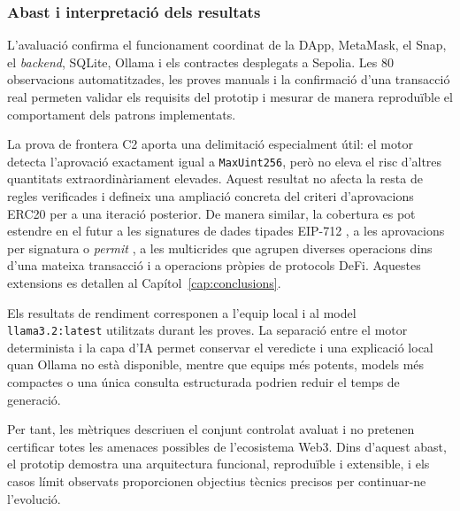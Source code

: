 \subsubsection{Abast i interpretació dels resultats}
\label{sec:limitacions_avaluacio}

L'avaluació confirma el funcionament coordinat de la DApp, MetaMask, el Snap, el \textit{backend}, SQLite, Ollama i els contractes desplegats a Sepolia. Les 80 observacions automatitzades, les proves manuals i la confirmació d'una transacció real permeten validar els requisits del prototip i mesurar de manera reproduïble el comportament dels patrons implementats.

La prova de frontera C2 aporta una delimitació especialment útil: el motor detecta l'aprovació exactament igual a \texttt{MaxUint256}, però no eleva el risc d'altres quantitats extraordinàriament elevades. Aquest resultat no afecta la resta de regles verificades i defineix una ampliació concreta del criteri d'aprovacions ERC20 per a una iteració posterior. De manera similar, la cobertura es pot estendre en el futur a les signatures de dades tipades EIP-712 \cite{eip712}, a les aprovacions per signatura o \textit{permit} \cite{eip2612}, a les multicrides que agrupen diverses operacions dins d'una mateixa transacció \cite{openzeppelin_contracts} i a operacions pròpies de protocols DeFi. Aquestes extensions es detallen al Capítol~\ref{cap:conclusions}.

Els resultats de rendiment corresponen a l'equip local i al model \texttt{llama3.2:latest} utilitzats durant les proves. La separació entre el motor determinista i la capa d'IA permet conservar el veredicte i una explicació local quan Ollama no està disponible, mentre que equips més potents, models més compactes o una única consulta estructurada podrien reduir el temps de generació.

Per tant, les mètriques descriuen el conjunt controlat avaluat i no pretenen certificar totes les amenaces possibles de l'ecosistema Web3. Dins d'aquest abast, el prototip demostra una arquitectura funcional, reproduïble i extensible, i els casos límit observats proporcionen objectius tècnics precisos per continuar-ne l'evolució.
